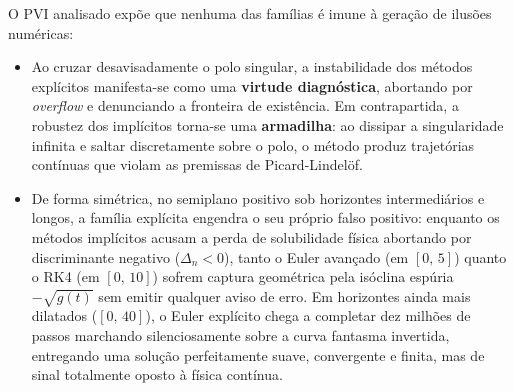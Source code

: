 \documentclass[12pt, a4paper]{article}
\begin{document}
O PVI analisado expõe que nenhuma das famílias é imune à geração de ilusões numéricas:
\begin{itemize}
    \item Ao cruzar desavisadamente o polo singular, a instabilidade dos métodos explícitos manifesta-se como uma \textbf{virtude diagnóstica}, abortando por \emph{overflow} e denunciando a fronteira de existência. Em contrapartida, a robustez dos implícitos torna-se uma \textbf{armadilha}: ao dissipar a singularidade infinita e saltar discretamente sobre o polo, o método produz trajetórias contínuas que violam as premissas de Picard-Lindelöf.
    \item De forma simétrica, no semiplano positivo sob horizontes intermediários e longos, a família explícita engendra o seu próprio falso positivo: enquanto os métodos implícitos acusam a perda de solubilidade física abortando por discriminante negativo ($\Delta_n < 0$), tanto o Euler avançado (em $[0,\, 5]$) quanto o RK4 (em $[0,\, 10]$) sofrem captura geométrica pela isóclina espúria $-\sqrt{g(t)}$ sem emitir qualquer aviso de erro. Em horizontes ainda mais dilatados ($[0,\, 40]$), o Euler explícito chega a completar dez milhões de passos marchando silenciosamente sobre a curva fantasma invertida, entregando uma solução perfeitamente suave, convergente e finita, mas de sinal totalmente oposto à física contínua.
\end{itemize}
\end{document}
